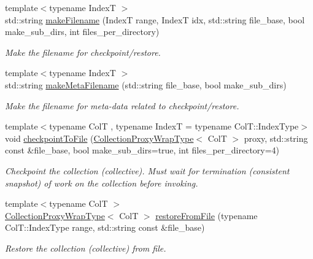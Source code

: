 \begin{DoxyCompactItemize}
{\footnotesize template$<$typename IndexT $>$ }\\std\+::string \hyperlink{structvt_1_1vrt_1_1collection_1_1_collection_manager_ae8d3db4274a1239fa0097dae11e93bb9}{make\+Filename} (IndexT range, IndexT idx, std\+::string file\+\_\+base, bool make\+\_\+sub\+\_\+dirs, int files\+\_\+per\+\_\+directory)
\begin{DoxyCompactList}\small\item\em Make the filename for checkpoint/restore. \end{DoxyCompactList}\item 
{\footnotesize template$<$typename IndexT $>$ }\\std\+::string \hyperlink{structvt_1_1vrt_1_1collection_1_1_collection_manager_abe41e7e9c9dec081a79b222b4c5dc199}{make\+Meta\+Filename} (std\+::string file\+\_\+base, bool make\+\_\+sub\+\_\+dirs)
\begin{DoxyCompactList}\small\item\em Make the filename for meta-\/data related to checkpoint/restore. \end{DoxyCompactList}\item 
{\footnotesize template$<$typename ColT , typename IndexT  = typename Col\+T\+::\+Index\+Type$>$ }\\void \hyperlink{structvt_1_1vrt_1_1collection_1_1_collection_manager_af3771d408c2ef15e65b9ba8219aa830a}{checkpoint\+To\+File} (\hyperlink{structvt_1_1vrt_1_1collection_1_1_collection_manager_a56458ed7f9bb22b631b9b3a745f42f94}{Collection\+Proxy\+Wrap\+Type}$<$ ColT $>$ proxy, std\+::string const \&file\+\_\+base, bool make\+\_\+sub\+\_\+dirs=true, int files\+\_\+per\+\_\+directory=4)
\begin{DoxyCompactList}\small\item\em Checkpoint the collection (collective). Must wait for termination (consistent snapshot) of work on the collection before invoking. \end{DoxyCompactList}\item 
{\footnotesize template$<$typename ColT $>$ }\\\hyperlink{structvt_1_1vrt_1_1collection_1_1_collection_manager_a56458ed7f9bb22b631b9b3a745f42f94}{Collection\+Proxy\+Wrap\+Type}$<$ ColT $>$ \hyperlink{structvt_1_1vrt_1_1collection_1_1_collection_manager_a315a74b9299f31ebc5e3e4becdd9f79e}{restore\+From\+File} (typename Col\+T\+::\+Index\+Type range, std\+::string const \&file\+\_\+base)
\begin{DoxyCompactList}\small\item\em Restore the collection (collective) from file. \end{DoxyCompactList}\item 

\end{DoxyCompactItemize}
